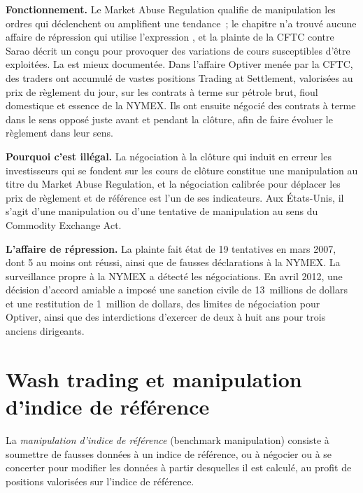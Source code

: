 \textbf{Fonctionnement.} Le Market Abuse Regulation qualifie de manipulation les ordres qui déclenchent ou amplifient une tendance~; le chapitre n'a trouvé aucune affaire de répression
qui utilise l'expression , et la plainte de la CFTC contre Sarao décrit un  conçu pour provoquer des variations de cours susceptibles d'être exploitées.
La  est mieux documentée. Dans l'affaire Optiver menée par la CFTC, des traders ont accumulé de vastes positions Trading at Settlement, valorisées
au prix de règlement du jour, sur les contrats à terme sur pétrole brut, fioul domestique et essence de la NYMEX. Ils ont ensuite négocié des contrats à terme dans le sens opposé juste avant et pendant la
clôture, afin de faire évoluer le règlement dans leur sens.

\textbf{Pourquoi c'est illégal.} La négociation à la clôture qui induit en erreur les investisseurs qui se fondent sur les cours de clôture constitue une manipulation au titre du Market Abuse Regulation,
et la négociation calibrée pour déplacer les prix de règlement et de référence est l'un de ses indicateurs. Aux États-Unis, il s'agit d'une manipulation ou d'une tentative de manipulation
au sens du Commodity Exchange Act.

\textbf{L'affaire de répression.} La plainte fait état de 19 tentatives en mars 2007, dont 5 au moins ont réussi, ainsi que de fausses déclarations à la NYMEX. La surveillance propre
à la NYMEX a détecté les négociations. En avril 2012, une décision d'accord amiable a imposé une sanction civile de 13~millions de dollars et une restitution de 1~million de dollars,
des limites de négociation pour Optiver, ainsi que des interdictions d'exercer de deux à huit ans pour trois anciens dirigeants.

\section{Wash trading et manipulation d'indice de référence}

\begin{definition}\label{def:s2:manipulative-strategies-and-how-they-are-caught:benchmark}
La \emph{manipulation d'indice de référence} (benchmark manipulation) consiste à soumettre de fausses données à un indice de référence, ou à négocier ou à se concerter pour modifier les données
à partir desquelles il est calculé, au profit de positions valorisées sur l'indice de référence.
\end{definition}

